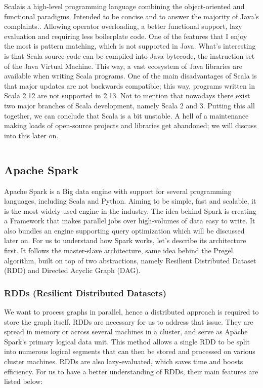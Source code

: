 Scala\footnotemark is a high-level programming language combining the object-oriented and functional paradigms. Intended to be concise and to answer the majority of Java's complaints.\footnotemark. Allowing operator overloading, a better functional support, lazy evaluation and requiring less boilerplate code. One of the features that I enjoy the most is pattern matching, which is not supported in Java. What's interesting is that Scala source code can be compiled into Java bytecode, the instruction set of the Java Virtual Machine. This way, a vast ecosystem of Java libraries are available when writing Scala programs. One of the main disadvantages of Scala is that major updates are not backwards compatible; this way, programs written in Scala 2.12 are not supported in 2.13. Not to mention that nowadays there exist two major branches of Scala development, namely Scala 2 and 3. Putting this all together, we can conclude that Scala is a bit unstable. A hell of a maintenance making loads of open-source projects and libraries get abandoned; we will discuss into this later on.

\begin{code}
    \inputminted{scala}{code/listings/7-1_helloWorld.scala}
\end{code}

\subsection{Apache Spark}

Apache Spark is a Big data engine with support for several programming languages, including Scala and Python. Aiming to be simple, fast and scalable, it is the most widely-used engine in the industry. The idea behind Spark is creating a Framework that makes parallel jobs over high-volumes of data easy to write. It also bundles an engine supporting query optimization which will be discussed later on. For us to understand how Spark works, let's describe its architecture first. It follows the master-slave architecture, same idea behind the Pregel algorithm, built on top of two abstractions, namely Resilient Distributed Dataset (RDD) and Directed Acyclic Graph (DAG).

\subsubsection{RDDs (Resilient Distributed Datasets)}

We want to process graphs in parallel, hence a distributed approach is required to store the graph itself. RDDs are necessary for us to address that issue. They are spread in memory or across several machines in a cluster, and serve as Apache Spark's primary logical data unit. This method allows a single RDD to be split into numerous logical segments that can then be stored and processed on various cluster machines. RDDs are also lazy-evaluated, which saves time and boosts efficiency. For us to have a better understanding of RDDs, their main features are listed below:

